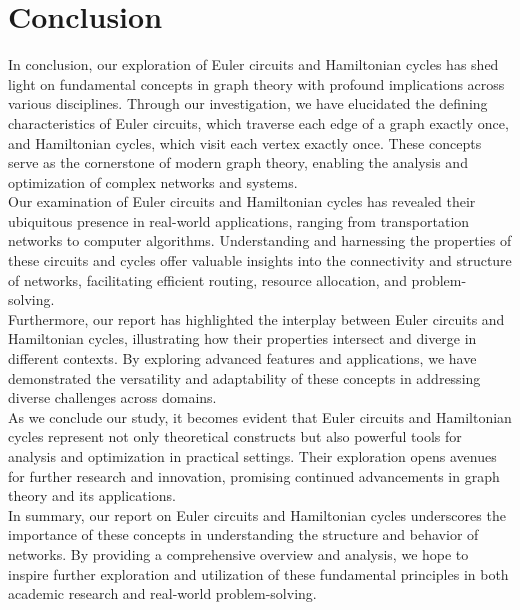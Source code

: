 \documentclass[14pt, times, a4paper]{extarticle}
\begin{document}
\section{Conclusion}
In conclusion, our exploration of Euler circuits and Hamiltonian cycles has shed light on fundamental concepts in graph theory with profound implications across various disciplines. Through our investigation, we have elucidated the defining characteristics of Euler circuits, which traverse each edge of a graph exactly once, and Hamiltonian cycles, which visit each vertex exactly once. These concepts serve as the cornerstone of modern graph theory, enabling the analysis and optimization of complex networks and systems.\\[0.3cm]
Our examination of Euler circuits and Hamiltonian cycles has revealed their ubiquitous presence in real-world applications, ranging from transportation networks to computer algorithms. Understanding and harnessing the properties of these circuits and cycles offer valuable insights into the connectivity and structure of networks, facilitating efficient routing, resource allocation, and problem-solving.\\[0.3cm]
Furthermore, our report has highlighted the interplay between Euler circuits and Hamiltonian cycles, illustrating how their properties intersect and diverge in different contexts. By exploring advanced features and applications, we have demonstrated the versatility and adaptability of these concepts in addressing diverse challenges across domains.\\[0.3cm]
As we conclude our study, it becomes evident that Euler circuits and Hamiltonian cycles represent not only theoretical constructs but also powerful tools for analysis and optimization in practical settings. Their exploration opens avenues for further research and innovation, promising continued advancements in graph theory and its applications.\\[0.3cm]
In summary, our report on Euler circuits and Hamiltonian cycles underscores the importance of these concepts in understanding the structure and behavior of networks. By providing a comprehensive overview and analysis, we hope to inspire further exploration and utilization of these fundamental principles in both academic research and real-world problem-solving.


\newpage
\end{document}

